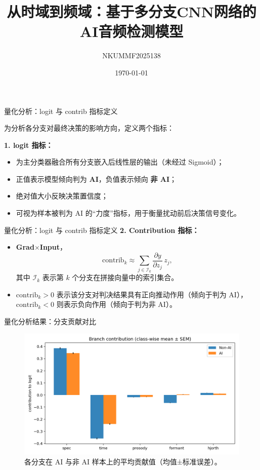 \documentclass[aspectratio=169]{beamer}
\title{从时域到频域：基于多分支CNN网络的AI音频检测模型}
\author{NKUMMF2025138}
\date{\today}
\begin{document}
\begin{frame}{量化分析：logit 与 contrib 指标定义}

为分析各分支对最终决策的影响方向，定义两个指标：

\vspace{0.6em}
\textbf{1. logit 指标：}
\begin{itemize}
  \item 为主分类器融合所有分支嵌入后线性层的输出（未经过 Sigmoid）；
  \item 正值表示模型倾向判为 \textbf{AI}，负值表示倾向 \textbf{非 AI}；
  \item 绝对值大小反映决策置信度；
  \item 可视为样本被判为 AI 的“力度”指标，用于衡量扰动前后决策信号变化。
\end{itemize}

\end{frame}
\begin{frame}{量化分析：logit 与 contrib 指标定义}
\vspace{0.6em}
\textbf{2. Contribution 指标：}
\begin{itemize}
  \item \textbf{Grad$\times$Input}，
    \[
      \mathrm{contrib}_k \approx
      \sum_{j \in \mathcal{I}_k}
      \frac{\partial y}{\partial z_j}\, z_j,
    \]
    其中 $\mathcal{I}_k$ 表示第 $k$ 个分支在拼接向量中的索引集合。
  \item $\mathrm{contrib}_k > 0$ 表示该分支对判决结果具有正向推动作用（倾向于判为 AI），
        $\mathrm{contrib}_k < 0$ 则表示负向作用（倾向于判为非 AI）。
\end{itemize}
\end{frame}

\begin{frame}{量化分析结果：分支贡献对比}
\begin{figure}
  \centering
  \includegraphics[width=0.7\linewidth]{images_in_paper/contrib_means_by_class.png}
  \caption{各分支在 AI 与非 AI 样本上的平均贡献值（均值±标准误差）。}
  \label{fig:contrib_means}
\end{figure}
\end{frame}
\end{document}
